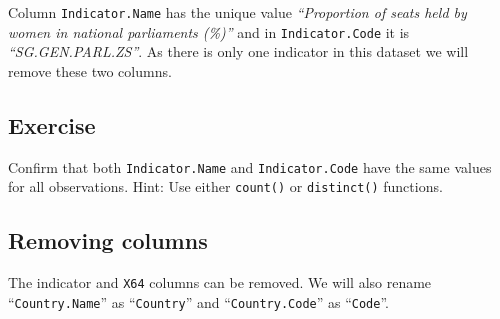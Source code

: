 \documentclass[a4paper,9pt,twocolumn,twoside,]{pinp}
\begin{document}
\begin{Shaded}
\end{Shaded}

Column \texttt{Indicator.Name} has the unique value \emph{``Proportion
of seats held by women in national parliaments (\%)''} and in
\texttt{Indicator.Code} it is \emph{``SG.GEN.PARL.ZS''}. As there is
only one indicator in this dataset we will remove these two columns.

\hypertarget{exercise-2}{%
\subsection{Exercise}\label{exercise-2}}

Confirm that both \texttt{Indicator.Name} and \texttt{Indicator.Code}
have the same values for all observations. Hint: Use either
\texttt{count()} or \texttt{distinct()} functions.

\hypertarget{removing-columns}{%
\subsection{Removing columns}\label{removing-columns}}

The indicator and \texttt{X64} columns can be removed. We will also
rename ``\texttt{Country.Name}'' as ``\texttt{Country}'' and
``\texttt{Country.Code}'' as ``\texttt{Code}''.

\begin{Shaded}
\end{Shaded}
\end{document}
